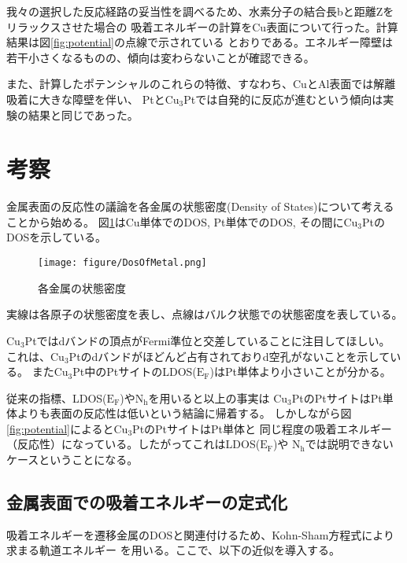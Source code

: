 \documentclass[12pt]{ltjsarticle}
\begin{document}
我々の選択した反応経路の妥当性を調べるため、水素分子の結合長bと距離Zをリラックスさせた場合の
吸着エネルギーの計算をCu表面について行った。計算結果は図\ref{fig:potential}の点線で示されている
とおりである。エネルギー障壁は若干小さくなるものの、傾向は変わらないことが確認できる。

また、計算したポテンシャルのこれらの特徴、すなわち、CuとAl表面では解離吸着に大きな障壁を伴い、
Ptと$\text{Cu}_\text{3}$Ptでは自発的に反応が進むという傾向は実験の結果と同じであった。

\section{考察}

金属表面の反応性の議論を各金属の状態密度(Density of States)について考えることから始める。
図\ref{fig:dosmetal}はCu単体でのDOS, Pt単体でのDOS, その間に$\text{Cu}_\text{3}$Ptの
DOSを示している。

\begin{figure}[hbtp]
    \begin{center}
     \texttt{[image: figure/DosOfMetal.png]}
    \end{center}
    \caption{各金属の状態密度}
    \label{fig:dosmetal}
\end{figure}

実線は各原子の状態密度を表し、点線はバルク状態での状態密度を表している。

$\text{Cu}_\text{3}$Ptではdバンドの頂点がFermi準位と交差していることに注目してほしい。
これは、$\text{Cu}_\text{3}$Ptのdバンドがほどんど占有されておりd空孔がないことを示している。
また$\text{Cu}_\text{3}$Pt中のPtサイトのLDOS($\text{E}_\text{F}$)はPt単体より小さいことが分かる。

従来の指標、LDOS($\text{E}_\text{F}$)や$\text{N}_\text{h}$を用いると以上の事実は
$\text{Cu}_\text{3}$PtのPtサイトはPt単体よりも表面の反応性は低いという結論に帰着する。
しかしながら図\ref{fig:potential}によると$\text{Cu}_\text{3}$PtのPtサイトはPt単体と
同じ程度の吸着エネルギー（反応性）になっている。したがってこれはLDOS($\text{E}_\text{F}$)や
$\text{N}_\text{h}$では説明できないケースということになる。

\subsection{金属表面での吸着エネルギーの定式化}
吸着エネルギーを遷移金属のDOSと関連付けるため、Kohn-Sham方程式により求まる軌道エネルギー
を用いる。ここで、以下の近似を導入する。\\
\end{document}
